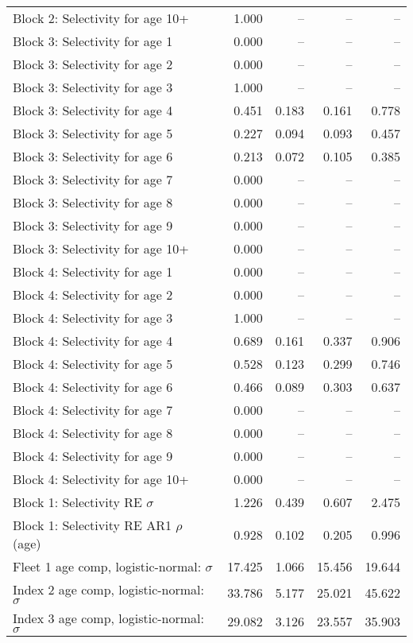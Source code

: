 \documentclass[
]{article}
\begin{document}
\begin{landscape}
\begin{longtable}[t]{lrrrr}
Block 2: Selectivity for age 10+ & 1.000 & -- & -- & --\\
Block 3: Selectivity for age 1 & 0.000 & -- & -- & --\\
Block 3: Selectivity for age 2 & 0.000 & -- & -- & --\\
Block 3: Selectivity for age 3 & 1.000 & -- & -- & --\\
\addlinespace
Block 3: Selectivity for age 4 & 0.451 & 0.183 & 0.161 & 0.778\\
Block 3: Selectivity for age 5 & 0.227 & 0.094 & 0.093 & 0.457\\
Block 3: Selectivity for age 6 & 0.213 & 0.072 & 0.105 & 0.385\\
Block 3: Selectivity for age 7 & 0.000 & -- & -- & --\\
Block 3: Selectivity for age 8 & 0.000 & -- & -- & --\\
\addlinespace
Block 3: Selectivity for age 9 & 0.000 & -- & -- & --\\
Block 3: Selectivity for age 10+ & 0.000 & -- & -- & --\\
Block 4: Selectivity for age 1 & 0.000 & -- & -- & --\\
Block 4: Selectivity for age 2 & 0.000 & -- & -- & --\\
Block 4: Selectivity for age 3 & 1.000 & -- & -- & --\\
\addlinespace
Block 4: Selectivity for age 4 & 0.689 & 0.161 & 0.337 & 0.906\\
Block 4: Selectivity for age 5 & 0.528 & 0.123 & 0.299 & 0.746\\
Block 4: Selectivity for age 6 & 0.466 & 0.089 & 0.303 & 0.637\\
Block 4: Selectivity for age 7 & 0.000 & -- & -- & --\\
Block 4: Selectivity for age 8 & 0.000 & -- & -- & --\\
\addlinespace
Block 4: Selectivity for age 9 & 0.000 & -- & -- & --\\
Block 4: Selectivity for age 10+ & 0.000 & -- & -- & --\\
Block 1: Selectivity RE $\sigma$ & 1.226 & 0.439 & 0.607 & 2.475\\
Block 1: Selectivity RE AR1 $\rho$ (age) & 0.928 & 0.102 & 0.205 & 0.996\\
Fleet 1 age comp, logistic-normal: $\sigma$ & 17.425 & 1.066 & 15.456 & 19.644\\
\addlinespace
Index 2 age comp, logistic-normal: $\sigma$ & 33.786 & 5.177 & 25.021 & 45.622\\
Index 3 age comp, logistic-normal: $\sigma$ & 29.082 & 3.126 & 23.557 & 35.903\\*
\end{longtable}
\end{landscape}
\end{document}
